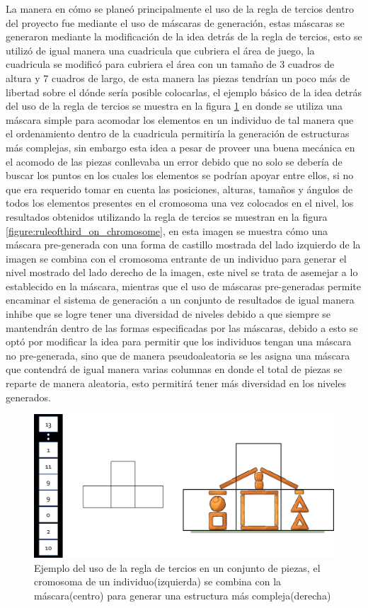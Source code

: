 La manera en cómo se planeó principalmente el uso de la regla de tercios dentro
del proyecto fue mediante el uso de máscaras de generación, estas máscaras se
generaron mediante la modificación de la idea detrás de la regla de tercios,
esto se utilizó de igual manera una cuadricula que cubriera el área de juego, la
cuadricula se modificó para cubriera el área con un tamaño de 3 cuadros de
altura y 7 cuadros de largo, de esta manera las piezas tendrían un poco más de
libertad sobre el dónde sería posible colocarlas, el ejemplo básico de la idea
detrás del uso de la regla de tercios se muestra en la figura
\ref{figure:ruleofthird_on_pieces} en donde se utiliza una máscara simple para
acomodar los elementos en un individuo de tal manera que el ordenamiento dentro
de la cuadricula permitiría la generación de estructuras más complejas, sin
embargo esta idea a pesar de proveer una buena mecánica en el acomodo de las
piezas conllevaba un error debido que no solo se debería de buscar los puntos en
los cuales los elementos se podrían apoyar entre ellos, si no que era requerido
tomar en cuenta las posiciones, alturas, tamaños y ángulos de todos los
elementos presentes en el cromosoma una vez colocados en el nivel, los
resultados obtenidos utilizando la regla de tercios se muestran en la figura
\ref{figure:ruleofthird_on_chromosome}, en esta imagen se muestra cómo una
máscara pre-generada con una forma de castillo mostrada del lado izquierdo de la
imagen se combina con el cromosoma entrante de un individuo para generar el
nivel mostrado del lado derecho de la imagen, este nivel se trata de asemejar a
lo establecido en la máscara, mientras que el uso de máscaras pre-generadas
permite encaminar el sistema de generación a un conjunto de resultados de igual
manera inhibe que se logre tener una diversidad de niveles debido a que siempre
se mantendrán dentro de las formas especificadas por las máscaras, debido a esto
se optó por modificar la idea para permitir que los individuos tengan una
máscara no pre-generada, sino que de manera pseudoaleatoria se les asigna una
máscara que contendrá de igual manera varias columnas en donde el total de
piezas se reparte de manera aleatoria, esto permitirá tener más diversidad en
los niveles generados.

\begin{figure}
  \centering
  \includegraphics[width=1.0\textwidth]{img/chromosome_thirds.png}
  \caption{Ejemplo del uso de la regla de tercios en un conjunto de piezas, el cromosoma de un individuo(izquierda) se combina con la máscara(centro) para generar una estructura más compleja(derecha)}
  \label{figure:ruleofthird_on_pieces}
\end{figure}

